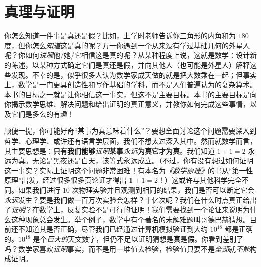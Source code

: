 \section{真理与证明}\label{sec:section1.1}

你怎么知道一件事是真还是假？比如，上学时老师告诉你三角形的内角和为 $180$ 度，但你怎么\emph{知道}这是真的呢？万一你遇到一个从来没有学过基础几何的外星人呢？你如何\emph{说服}他/她/它相信这是真的呢？从某种程度上说，这就是数学：设计新的陈述，以某种方式确定它们是真还是假，并向其他人（也可能是外星人）解释这些发现。不幸的是，似乎很多人认为数学家成天做的就是把大数乘在一起；但事实上，数学是一门更具创造性和写作基础的学科，而不是人们普遍认为的复杂算术。本书的目标之一就是让你相信这一事实，但这不是主要目标。本书的主要目标是向你揭示数学思维、解决问题和给出证明的真正意义，并教你如何完成这些事情，以及它们是多么的有趣！

顺便一提，你可能好奇``某事为真意味着什么''？要想全面讨论这个问题需要深入到哲学、心理学、或许还有语言学层面，我们不想太过深入其中。然而就数学而言，其主要思想是：\textbf{只有我们能够}\emph{证明}\textbf{某事}\emph{永远}\textbf{为真它才为真}。我们知道 $1+1=2$ 永远为真。无论是黑夜还是白天，该等式永远成立。（不过，你有没有想过如何证明这一事实？实际上证明这个问题非常困难！有本名为\emph{《数学原理》}的书从``第一性原理''出发，经过很多很多页论证才得出 $1+1=2$！）这或许与其他科学完全不同。如果我们进行 $10$ 次物理实验并且观测到相同的结果，我们是否可以断定它会\emph{永远}发生？要是我们做一百万次实验会怎样？十亿次呢？我们在什么时点真正给出了\emph{证明}？在数学上，反复实验不是可行的证明！我们需要找到一个论证来说明为什么这种现象总会发生。举个例子，数学中有个著名的未解难题叫\href{https://baike.baidu.com/item/哥德巴赫猜想/72364}{哥德巴赫猜想}。目前还不知道其是否正确，尽管我们已经通过计算机模拟验证到大约 $10^{18}$ 都是正确的。$10^{18}$ 是个\emph{巨大的}天文数字，但仍不足以证明猜想是\textbf{真}是\textbf{假}。你看到差别了吗？数学家喜欢\emph{证明}事实，而不是用一堆值去检验，检验值只要不是\emph{全部}就\emph{不能}构成证明。





